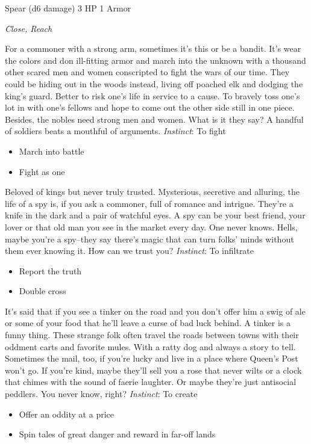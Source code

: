 \HRule
{}

Spear (d6 damage)\hspace*{\fill} 3 HP 1 Armor

\emph{Close, Reach}

\HRule
For a commoner with a strong arm, sometimes it's this or be a bandit. It's wear the colors and don ill-fitting armor and march into the unknown with a thousand other scared men and women conscripted to fight the wars of our time. They could be hiding out in the woods instead, living off poached elk and dodging the king's guard. Better to risk one's life in service to a cause. To bravely toss one's lot in with one's fellows and hope to come out the other side still in one piece. Besides, the nobles need strong men and women. What is it they say? A handful of soldiers beats a mouthful of arguments. \emph{Instinct}: To fight
\begin{itemize}
\item March into battle
\item Fight as one
\end{itemize}
\newpage
\HRule
{} 

\HRule
Beloved of kings but never truly trusted. Mysterious, secretive and alluring, the life of a spy is, if you ask a commoner, full of romance and intrigue. They're a knife in the dark and a pair of watchful eyes. A spy can be your best friend, your lover or that old man you see in the market every day. One never knows. Hells, maybe you're a spy--they say there's magic that can turn folks' minds without them ever knowing it. How can we trust you? \emph{Instinct}: To infiltrate
\begin{itemize}
\item Report the truth
\item Double cross
\end{itemize}

\HRule
{} 

\HRule
It's said that if you see a tinker on the road and you don't offer him a swig of ale or some of your food that he'll leave a curse of bad luck behind. A tinker is a funny thing. These strange folk often travel the roads between towns with their oddment carts and favorite mules. With a ratty dog and always a story to tell. Sometimes the mail, too, if you're lucky and live in a place where Queen's Post won't go. If you're kind, maybe they'll sell you a rose that never wilts or a clock that chimes with the sound of faerie laughter. Or maybe they're just antisocial peddlers. You never know, right? \emph{Instinct}: To create
\begin{itemize}
\item Offer an oddity at a price
\item Spin tales of great danger and reward in far-off lands
\end{itemize}
